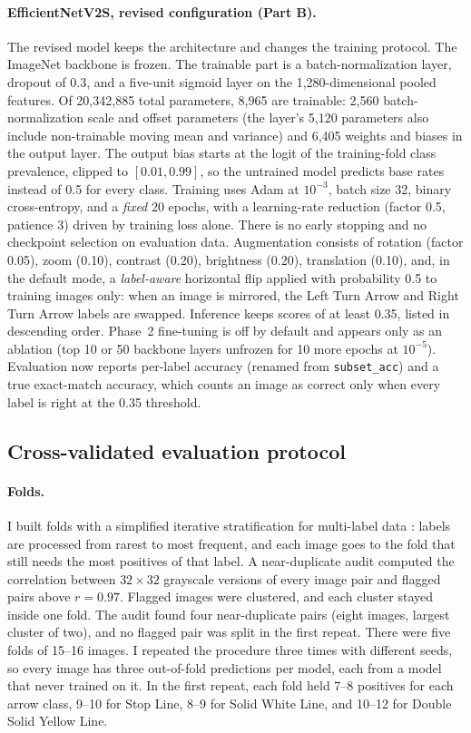 \documentclass[11pt]{article}
\begin{document}
\paragraph{EfficientNetV2S, revised configuration (Part B).} The revised model keeps the architecture and changes the training protocol. The ImageNet backbone is frozen. The trainable part is a batch-normalization layer, dropout of 0.3, and a five-unit sigmoid layer on the 1,280-dimensional pooled features. Of 20,342,885 total parameters, 8,965 are trainable: 2,560 batch-normalization scale and offset parameters (the layer's 5,120 parameters also include non-trainable moving mean and variance) and 6,405 weights and biases in the output layer. The output bias starts at the logit of the training-fold class prevalence, clipped to $[0.01,0.99]$, so the untrained model predicts base rates instead of 0.5 for every class. Training uses Adam at $10^{-3}$, batch size 32, binary cross-entropy, and a \emph{fixed} 20 epochs, with a learning-rate reduction (factor 0.5, patience 3) driven by training loss alone. There is no early stopping and no checkpoint selection on evaluation data. Augmentation consists of rotation (factor 0.05), zoom (0.10), contrast (0.20), brightness (0.20), translation (0.10), and, in the default mode, a \emph{label-aware} horizontal flip applied with probability 0.5 to training images only: when an image is mirrored, the Left Turn Arrow and Right Turn Arrow labels are swapped. Inference keeps scores of at least 0.35, listed in descending order. Phase~2 fine-tuning is off by default and appears only as an ablation (top 10 or 50 backbone layers unfrozen for 10 more epochs at $10^{-5}$). Evaluation now reports per-label accuracy (renamed from \texttt{subset\_acc}) and a true exact-match accuracy, which counts an image as correct only when every label is right at the 0.35 threshold.

\subsection{Cross-validated evaluation protocol}
\label{sec:cv-protocol}
\paragraph{Folds.} I built folds with a simplified iterative stratification for multi-label data \citep{sechidis2011}: labels are processed from rarest to most frequent, and each image goes to the fold that still needs the most positives of that label. A near-duplicate audit computed the correlation between $32\times32$ grayscale versions of every image pair and flagged pairs above $r=0.97$. Flagged images were clustered, and each cluster stayed inside one fold. The audit found four near-duplicate pairs (eight images, largest cluster of two), and no flagged pair was split in the first repeat. There were five folds of 15--16 images. I repeated the procedure three times with different seeds, so every image has three out-of-fold predictions per model, each from a model that never trained on it. In the first repeat, each fold held 7--8 positives for each arrow class, 9--10 for Stop Line, 8--9 for Solid White Line, and 10--12 for Double Solid Yellow Line.
\end{document}

